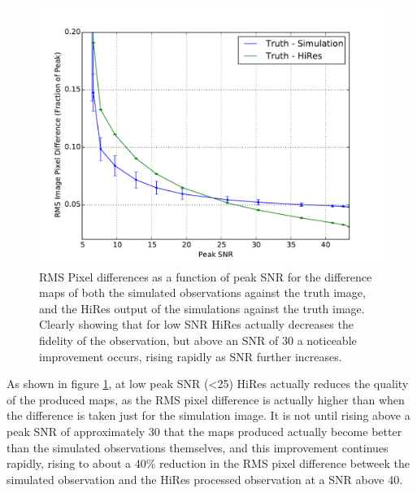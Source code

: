 \begin{figure}[H]
    \centering
    \includegraphics[width=\linewidth]{figures/differences.pdf}
    \caption[RMS Pixel differences as a function of peak SNR]{RMS Pixel differences as a function of peak SNR for the difference maps of both the simulated observations against the truth image, and the HiRes output of the simulations against the truth image. Clearly showing that for low SNR HiRes actually decreases the fidelity of the observation, but above an SNR of 30 a noticeable improvement occurs, rising rapidly as SNR further increases.}
    \label{diffresults}
\end{figure}

As shown in figure \ref{diffresults}, at low peak SNR (\textless 25) HiRes actually reduces the quality of the produced maps, as the RMS pixel difference is actually higher than when the difference is taken just for the simulation image. It is not until rising above a peak SNR of approximately 30 that the maps produced actually become better than the simulated observations themselves, and this improvement continues rapidly, rising to about a 40\% reduction in the RMS pixel difference betweek the simulated observation and the HiRes processed observation at a SNR above 40.
